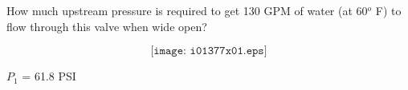 

How much upstream pressure is required to get 130 GPM of water (at 60$^{o}$ F) to flow through this valve when wide open?

$$\texttt{[image: i01377x01.eps]}$$







$P_1$ = 61.8 PSI
 









